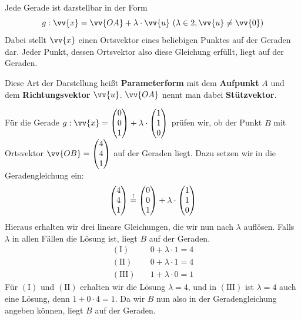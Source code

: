 \documentclass[ngerman, 12pt]{nssheetxea}
\begin{document}
\begin{definition}
Jede Gerade ist darstellbar in der Form
\[ g:\vv{x}=\vv{OA}+\lambda\cdot \vv{u} \ (\lambda \in \R, \vv{u} \neq \vv{0})  \]
Dabei stellt $\vv{x}$ einen Ortsvektor eines beliebigen Punktes auf der Geraden dar. Jeder Punkt, dessen Ortsvektor also diese Gleichung erfüllt, liegt auf der Geraden. \par
Diese Art der Darstellung heißt \textbf{Parameterform}  mit dem \textbf{Aufpunkt} $A$ und dem \textbf{Richtungsvektor} $\vv{u}$. $\vv{OA}$ nennt man dabei \textbf{Stützvektor}.
\begin{center}
\end{center}
\end{definition}

\begin{example}
Für die Gerade $g:\vv{x}=\colvec[0]{0}{1}+\lambda \cdot \colvec[1]{1}{0}$ prüfen wir, ob der Punkt $B$ mit Ortsvektor $\vv{OB}=\colvec[4]{4}{1}$ auf der Geraden liegt. Dazu setzen wir in die Geradengleichung ein:
\[ \colvec[4]{4}{1} \stackrel{!}{=} \colvec[0]{0}{1} + \lambda \cdot \colvec[1]{1}{0} \]
Hieraus erhalten wir drei lineare Gleichungen, die wir nun nach $\lambda$ auflösen. Falls $\lambda$ in allen Fällen die Lösung ist, liegt $B$ auf der Geraden.
\begin{align*}
\mathrm{(I)}\quad	&	0 + \lambda \cdot 1 = 4 \\
\mathrm{(II)}\quad	&	0 + \lambda \cdot 1 = 4 \\
\mathrm{(III)}\quad	&	1 + \lambda \cdot 0 = 1
\end{align*}
Für $\mathrm{(I)}$ und $\mathrm{(II)}$ erhalten wir die Lösung $\lambda = 4$, und in $\mathrm{(III)}$ ist $\lambda=4$ auch eine Lösung, denn $1+ 0 \cdot 4 = 1$. Da wir $B$ nun also in der Geradengleichung angeben können, liegt $B$ auf der Geraden.
\end{example}
\end{document}
